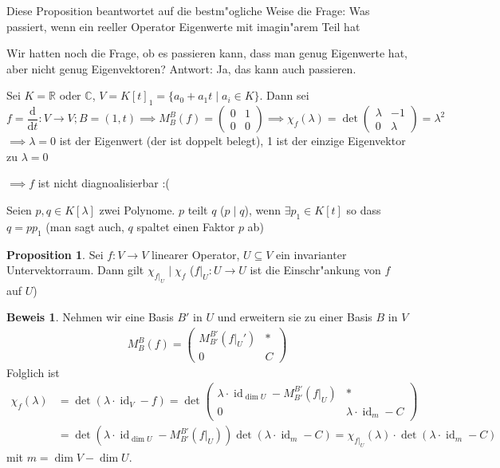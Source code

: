 \documentclass[oneside,fontsize=11pt,paper=a4,BCOR=0mm,DIV=12,automark,headsepline]{scrbook}
\newcommand{\gq}[1]{\glqq{}#1\grqq{}} %
\DeclareMathOperator{\mId}{id}
\theoremstyle{remark}
\theoremstyle{definition}
\newtheorem*{proposition}{Proposition}
\theoremstyle{definition}
\newtheorem*{prof}{Beweis}
\theoremstyle{remark}
\begin{document}
Diese Proposition beantwortet auf die bestm"ogliche Weise die Frage: \gq{Was
passiert, wenn ein reeller Operator Eigenwerte mit imagin"arem Teil hat}

\begin{exa}
  Wir hatten noch die Frage, ob es passieren kann, dass man \gq{genug} Eigenwerte hat, aber nicht genug Eigenvektoren? Antwort: Ja, das kann auch passieren.

  Sei \(K = \mathbb{R}\) oder \(\mathbb{C}\), \(V = K[t]_1 = \{a_0 + a_1 t\mid a_i\in K\}\). Dann sei
  \[f = \frac{\text{d}}{\text{d}t}: V\to V; B = (1, t) \implies M^B_B(f) =
    \begin{pmatrix}
      0 & 1 \\
      0 & 0
    \end{pmatrix}
   \implies \chi_f(\lambda) = \det
   \begin{pmatrix}
     \lambda & -1 \\
     0 & \lambda
   \end{pmatrix} = \lambda^2
\] \(\implies \lambda = 0\) ist der Eigenwert (der ist doppelt belegt), 1 ist der einzige Eigenvektor zu \(\lambda = 0\)

  \(\implies f\) ist nicht diagnoalisierbar :(
\end{exa}

\begin{definition}
  Seien $p,q\in K[\lambda]$ zwei Polynome. $p$ teilt $q$ ($p\mid q$), wenn \(\exists p_1 \in K[t]\) so dass \(q = pp_1\)
  (man sagt auch, \(q\) spaltet einen Faktor \(p\) ab)
\end{definition}

\begin{proposition}
  Sei \(f: V\to V\) linearer Operator, $U\subseteq V$ ein invarianter Untervektorraum. Dann gilt \(\chi_{f|_U} \mid \chi_f\) (\(f|_U:U\to U\) ist die Einschr"ankung von \(f\) auf \(U\))
\end{proposition}
\begin{prof}
  Nehmen wir eine Basis $B'$ in $U$ und erweitern sie zu einer Basis $B$ in $V$
  \begin{align*}
    M^B_B(f) =
    \begin{pmatrix}
      M^{B'}_{B'}(f|_U') & * \\
      0 & C
    \end{pmatrix}
  \end{align*}
  Folglich ist
  \begin{align*}
    \chi_f(\lambda) &= \det(\lambda\cdot\mId_V - f) = \det
    \begin{pmatrix}
      \lambda\cdot\mId_{\dim U} - M^{B'}_{B'}(f|_U) & *\\
      0 & \lambda\cdot\mId_m - C
    \end{pmatrix}\\
    &= \det(\lambda\cdot\mId_{\dim U} - M^{B'}_{B'}(f|_U))\det(\lambda\cdot\mId_m  - C) = \chi_{f|_U}(\lambda)\cdot\det(\lambda\cdot\mId_m - C)
  \end{align*}
  mit \(m = \dim V - \dim U\).
\end{prof}
\end{document}

